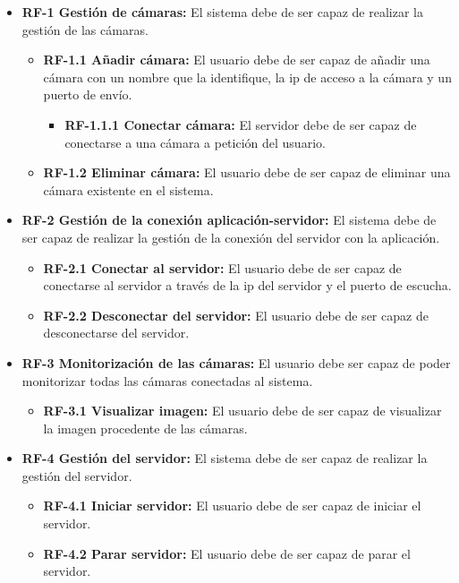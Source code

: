 \begin{itemize}
	\item
		\textbf{RF-1 Gestión de cámaras:} 
			El sistema debe de ser capaz de realizar la gestión de las cámaras.
		\begin{itemize}
			\item
				\textbf{RF-1.1 Añadir cámara:}
					El usuario debe de ser capaz de añadir una cámara con un nombre que la identifique, la ip de acceso a la cámara y un puerto de envío. 
					\begin{itemize}
						\item
							\textbf{RF-1.1.1 Conectar cámara:}
								El servidor debe de ser capaz de conectarse a una cámara a petición del usuario.
					\end{itemize}
			\item
				\textbf{RF-1.2 Eliminar cámara:}
					El usuario debe de ser capaz de eliminar una cámara existente en el sistema.
		\end{itemize}
		
	\item
		\textbf{RF-2 Gestión de la conexión aplicación-servidor:} 
			El sistema debe de ser capaz de realizar la gestión de la conexión del servidor con la aplicación.
		\begin{itemize}
			\item
				\textbf{RF-2.1 Conectar al servidor:}
					El usuario debe de ser capaz de conectarse al servidor a través de la ip del servidor y el puerto de escucha. 
			\item
				\textbf{RF-2.2 Desconectar del servidor:}
					El usuario debe de ser capaz de desconectarse del servidor.
		\end{itemize}
		
	\item
		\textbf{RF-3 Monitorización de las cámaras:} 
			El usuario debe ser capaz de poder monitorizar todas las cámaras conectadas al sistema.
			\begin{itemize}
			\item
				\textbf{RF-3.1 Visualizar imagen:}
					El usuario debe de ser capaz de visualizar la imagen procedente de las cámaras.
		\end{itemize}
	
	\item
		\textbf{RF-4 Gestión del servidor:} 
			El sistema debe de ser capaz de realizar la gestión del servidor.
		\begin{itemize}
			\item
				\textbf{RF-4.1 Iniciar servidor:}
					El usuario debe de ser capaz de iniciar el servidor.
			\item
				\textbf{RF-4.2 Parar servidor:}
					El usuario debe de ser capaz de parar el servidor.
		\end{itemize}
\end{itemize}



